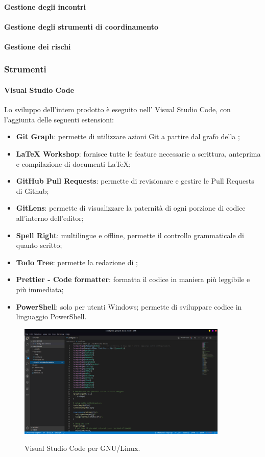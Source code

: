 \documentclass[../norme-di-progetto.tex]{subfiles}
\begin{document}
\paragraph{Gestione degli incontri}
\paragraph{Gestione degli strumenti di coordinamento}
\paragraph{Gestione dei rischi}

\subsubsection{Strumenti}
\paragraph{Visual Studio Code}
Lo sviluppo dell'intero prodotto è eseguito nell' Visual Studio Code, con l'aggiunta delle seguenti estensioni:
\begin{itemize}
  \item \textbf{Git Graph}: permette di utilizzare azioni Git a partire dal grafo della ;
  \item \textbf{LaTeX Workshop}: fornisce tutte le feature necessarie a scrittura, anteprima e compilazione di documenti \LaTeX;
  \item \textbf{GitHub Pull Requests}: permette di revisionare e gestire le Pull Requests di Github;
  \item \textbf{GitLens}: permette di visualizzare la paternità di ogni porzione di codice all'interno dell'editor;
  \item \textbf{Spell Right}:  multilingue e offline, permette il controllo grammaticale di quanto scritto;
  \item \textbf{Todo Tree}: permette la redazione di ;
  \item \textbf{Prettier - Code formatter}: formatta il codice in maniera più leggibile e più immediata;
  \item \textbf{PowerShell}: solo per utenti Windows; permette di sviluppare codice in linguaggio PowerShell.
\end{itemize}

\begin{figure}[H]
  \centering
  \includegraphics[width=10cm]{img/vscode.png}
  \label{fig:github}
  \caption{Visual Studio Code per GNU/Linux.}
\end{figure}
\end{document}

